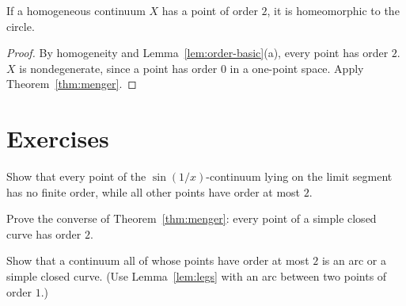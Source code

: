 \begin{corollary}\label{cor:order-two}
If a homogeneous continuum $X$ has a point of order $2$, it is homeomorphic to the circle.
\end{corollary}

\begin{proof}
By homogeneity and Lemma~\ref{lem:order-basic}(a), every point has order $2$. $X$ is nondegenerate, since a point has order $0$ in a
one-point space. Apply Theorem~\ref{thm:menger}.
\end{proof}


\section*{Exercises}

\begin{exercise}
Show that every point of the $\sin(1/x)$-continuum lying on the limit segment has no finite order, while all other points have
order at most $2$.
\end{exercise}

\begin{exercise}
Prove the converse of Theorem~\ref{thm:menger}: every point of a simple closed curve has order $2$.
\end{exercise}

\begin{exercise}
Show that a continuum all of whose points have order at most $2$ is an arc or a simple closed curve. (Use
Lemma~\ref{lem:legs} with an arc between two points of order $1$.)
\end{exercise}
